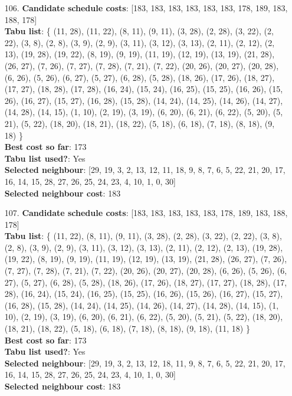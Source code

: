 \documentclass[fleqn]{article}
\begin{document}
\begin{itemize}
    \item[106.] \textbf{Candidate schedule costs}: [183, 183, 183, 183, 183, 183, 178, 189, 183, 188, 178] \\
    \textbf{Tabu list}: \{ (11, 28), (11, 22), (8, 11), (9, 11), (3, 28), (2, 28), (3, 22), (2, 22), (3, 8), (2, 8), (3, 9), (2, 9), (3, 11), (3, 12), (3, 13), (2, 11), (2, 12), (2, 13), (19, 28), (19, 22), (8, 19), (9, 19), (11, 19), (12, 19), (13, 19), (21, 28), (26, 27), (7, 26), (7, 27), (7, 28), (7, 21), (7, 22), (20, 26), (20, 27), (20, 28), (6, 26), (5, 26), (6, 27), (5, 27), (6, 28), (5, 28), (18, 26), (17, 26), (18, 27), (17, 27), (18, 28), (17, 28), (16, 24), (15, 24), (16, 25), (15, 25), (16, 26), (15, 26), (16, 27), (15, 27), (16, 28), (15, 28), (14, 24), (14, 25), (14, 26), (14, 27), (14, 28), (14, 15), (1, 10), (2, 19), (3, 19), (6, 20), (6, 21), (6, 22), (5, 20), (5, 21), (5, 22), (18, 20), (18, 21), (18, 22), (5, 18), (6, 18), (7, 18), (8, 18), (9, 18) \} \\
    \textbf{Best cost so far}: 173 \\
    \textbf{Tabu list used?}: Yes \\
    \textbf{Selected neighbour}: [29, 19, 3, 2, 13, 12, 11, 18, 9, 8, 7, 6, 5, 22, 21, 20, 17, 16, 14, 15, 28, 27, 26, 25, 24, 23, 4, 10, 1, 0, 30] \\
    \textbf{Selected neighbour cost}: 183
      

    \item[107.] \textbf{Candidate schedule costs}: [183, 183, 183, 183, 183, 178, 189, 183, 188, 178] \\
    \textbf{Tabu list}: \{ (11, 22), (8, 11), (9, 11), (3, 28), (2, 28), (3, 22), (2, 22), (3, 8), (2, 8), (3, 9), (2, 9), (3, 11), (3, 12), (3, 13), (2, 11), (2, 12), (2, 13), (19, 28), (19, 22), (8, 19), (9, 19), (11, 19), (12, 19), (13, 19), (21, 28), (26, 27), (7, 26), (7, 27), (7, 28), (7, 21), (7, 22), (20, 26), (20, 27), (20, 28), (6, 26), (5, 26), (6, 27), (5, 27), (6, 28), (5, 28), (18, 26), (17, 26), (18, 27), (17, 27), (18, 28), (17, 28), (16, 24), (15, 24), (16, 25), (15, 25), (16, 26), (15, 26), (16, 27), (15, 27), (16, 28), (15, 28), (14, 24), (14, 25), (14, 26), (14, 27), (14, 28), (14, 15), (1, 10), (2, 19), (3, 19), (6, 20), (6, 21), (6, 22), (5, 20), (5, 21), (5, 22), (18, 20), (18, 21), (18, 22), (5, 18), (6, 18), (7, 18), (8, 18), (9, 18), (11, 18) \} \\
    \textbf{Best cost so far}: 173 \\
    \textbf{Tabu list used?}: Yes \\
    \textbf{Selected neighbour}: [29, 19, 3, 2, 13, 12, 18, 11, 9, 8, 7, 6, 5, 22, 21, 20, 17, 16, 14, 15, 28, 27, 26, 25, 24, 23, 4, 10, 1, 0, 30] \\
    \textbf{Selected neighbour cost}: 183
      


\end{itemize}
\end{document}
